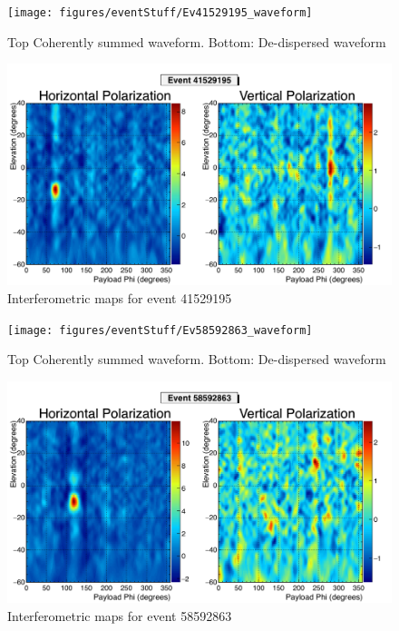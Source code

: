 		\begin{figure}
		\centering
			\texttt{[image: figures/eventStuff/Ev41529195\_waveform]}
			\caption{Top Coherently summed waveform.  Bottom: De-dispersed waveform} 
		\label{fig:Ev41529195_waveform}
		\end{figure}
		
		\begin{figure}
		\centering
			\includegraphics[width=\textwidth]{figures/intMap/intMap_ev41529195}
			\caption{Interferometric maps for event 41529195} 
		\label{fig:Ev41529195_map}
		\end{figure}			
	
		\begin{figure}
		\centering
			\texttt{[image: figures/eventStuff/Ev58592863\_waveform]}
			\caption{Top Coherently summed waveform.  Bottom: De-dispersed waveform} 
		\label{fig:Ev58592863_waveform}
		\end{figure}
		
		\begin{figure}
		\centering
			\includegraphics[width=\textwidth]{figures/intMap/intMap_ev58592863}
			\caption{Interferometric maps for event 58592863} 
		\label{fig:Ev58592863_map}
		\end{figure}			

